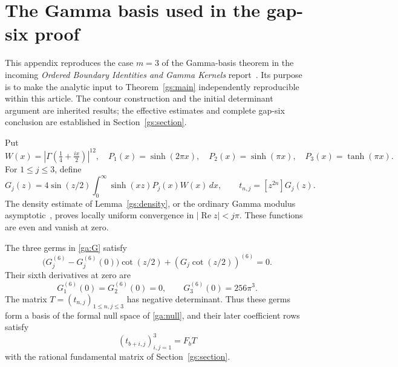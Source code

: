 \section{The Gamma basis used in the gap-six proof}
\label{ga:appendix}

This appendix reproduces the case $m=3$ of the Gamma-basis theorem
in the incoming \emph{Ordered Boundary Identities and Gamma Kernels}
report~\cite[Section~8]{OrderedIncoming}.  Its purpose is to make the
analytic input to Theorem~\ref{gs:main} independently reproducible
within this article.  The contour construction and the initial
determinant argument are inherited results; the effective estimates
and complete gap-six conclusion are established in Section~\ref{gs:section}.

Put
\[
 W(x)=\left|\Gamma\!\left(\tfrac14+\tfrac{ix}{2}\right)\right|^{12},
 \quad P_1(x)=\sinh(2\pi x),\quad P_2(x)=\sinh(\pi x),
 \quad P_3(x)=\tanh(\pi x).
\]
For $1\le j\le3$, define
\begin{equation}\label{ga:G}
 G_j(z)=4\sin(z/2)\int_0^\infty\sinh(xz)P_j(x)W(x)\,dx,
 \qquad t_{n,j}=[z^{2n}]G_j(z).
\end{equation}
The density estimate of Lemma~\ref{gs:density}, or the ordinary
Gamma modulus asymptotic~\cite[Equation~5.11.9]{DLMF}, proves
locally uniform convergence in $|\operatorname{Re}z|<j\pi$.
These functions are even and vanish at zero.

\begin{proposition}\label{ga:basis}
The three germs in \eqref{ga:G} satisfy
\begin{equation}\label{ga:null}
 \bigl(G_j^{(6)}-G_j^{(6)}(0)\bigr)\cot(z/2)
                    +(G_j\cot(z/2))^{(6)}=0.
\end{equation}
Their sixth derivatives at zero are
\begin{equation}\label{ga:top}
 G_1^{(6)}(0)=G_2^{(6)}(0)=0,
 \qquad G_3^{(6)}(0)=256\pi^3.
\end{equation}
The matrix $T=(t_{n,j})_{1\le n,j\le3}$ has negative determinant.
Thus these germs form a basis of the formal null space of
\eqref{ga:null}, and their later coefficient rows satisfy
\[
                     (t_{b+i,j})_{i,j=1}^3=F_bT
\]
with the rational fundamental matrix of Section~\ref{gs:section}.
\end{proposition}

